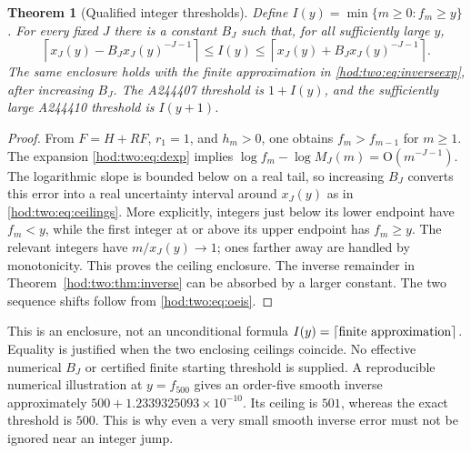 \documentclass[11pt,letterpaper]{article}
\newtheorem{theorem}{Theorem}[section]
\theoremstyle{definition}\newtheorem{definition}[theorem]{Definition}
\theoremstyle{remark}\newtheorem{remark}[theorem]{Remark}
\newcommand{\bigO}{\mathrm O}
\begin{document}
\begin{theorem}[Qualified integer thresholds]\label{hod:two:thm:threshold}
Define $I(y)=\min\{m\ge0:f_m\ge y\}$. For every fixed $J$ there is a constant $B_J$ such that, for all sufficiently large $y$,
\begin{equation}\label{hod:two:eq:ceilings}
\left\lceil x_J(y)-B_Jx_J(y)^{-J-1}\right\rceil
\le I(y)\le
\left\lceil x_J(y)+B_Jx_J(y)^{-J-1}\right\rceil.
\end{equation}
The same enclosure holds with the finite approximation in \eqref{hod:two:eq:inverseexp}, after increasing $B_J$. The A244407 threshold is $1+I(y)$, and the sufficiently large A244410 threshold is $I(y+1)$.
\end{theorem}
\begin{proof}
From $F=H+RF$, $r_1=1$, and $h_m>0$, one obtains $f_m>f_{m-1}$ for $m\ge1$. The expansion \eqref{hod:two:eq:dexp} implies
$\log f_m-\log M_J(m)=\bigO(m^{-J-1})$.
The logarithmic slope is bounded below on a real tail, so increasing $B_J$ converts this error into a real uncertainty interval around $x_J(y)$ as in \eqref{hod:two:eq:ceilings}. More explicitly, integers just below its lower endpoint have $f_m<y$, while the first integer at or above its upper endpoint has $f_m\ge y$. The relevant integers have $m/x_J(y)\to1$; ones farther away are handled by monotonicity. This proves the ceiling enclosure. The inverse remainder in Theorem~\ref{hod:two:thm:inverse} can be absorbed by a larger constant. The two sequence shifts follow from \eqref{hod:two:eq:oeis}.
\end{proof}
This is an enclosure, not an unconditional formula $I(y)=\lceil\hbox{finite approximation}\rceil$. Equality is justified when the two enclosing ceilings coincide. No effective numerical $B_J$ or certified finite starting threshold is supplied. A reproducible numerical illustration at $y=f_{500}$ gives an order-five smooth inverse approximately $500+1.2339325093\times10^{-10}$. Its ceiling is $501$, whereas the exact threshold is $500$. This is why even a very small smooth inverse error must not be ignored near an integer jump.
\end{document}
